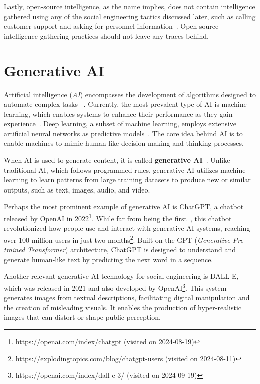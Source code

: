 Lastly, open-source intelligence, as the name implies, does not contain intelligence gathered using any of the social engineering tactics discussed later, such as calling customer support and asking for personnel information~\citep{hadnagy_Social_Engineering_The_Science_2018}. Open-source intelligence-gathering practices should not leave any traces behind.





\section{Generative AI}

Artificial intelligence (\textit{AI}) encompasses the development of algorithms designed to automate complex tasks ~\citep{mirsky_Threat_Offensive_AI_Organizations_2023}. Currently, the most prevalent type of AI is machine learning, which enables systems to enhance their performance as they gain experience~\citep{fakhouri_AI_Driven_Solutions_SE_Attacks_2024}. Deep learning, a subset of machine learning, employs extensive artificial neural networks as predictive models~\citep{goodfellow_Generative_Adversarial_Networks_2020}. The core idea behind AI is to enable machines to mimic human-like decision-making and thinking processes.

When AI is used to generate content, it is called \textbf{generative AI}~\citep{goodfellow_Generative_Adversarial_Networks_2020}. Unlike traditional AI, which follows programmed rules, generative AI utilizes machine learning to learn patterns from large training datasets to produce new or similar outputs, such as text, images, audio, and video.

Perhaps the most prominent example of generative AI is ChatGPT, a chatbot released by OpenAI in 2022\footnote{https://openai.com/index/chatgpt (visited on 2024-08-19)}. While far from being the first~\citep{weizenbaum_ELIZA_1996}, this chatbot revolutionized how people use and interact with generative AI systems, reaching over 100 million users in just two months\footnote{https://explodingtopics.com/blog/chatgpt-users (visited on 2024-08-11)}. Built on the GPT (\textit{Generative Pre-trained Transformer}) architecture, ChatGPT is designed to understand and generate human-like text by predicting the next word in a sequence.

Another relevant generative AI technology for social engineering is DALL-E, which was released in 2021 and also developed by OpenAI\footnote{https://openai.com/index/dall-e-3/ (visited on 2024-09-19)}. This system generates images from textual descriptions, facilitating digital manipulation and the creation of misleading visuals. It enables the production of hyper-realistic images that can distort or shape public perception.
